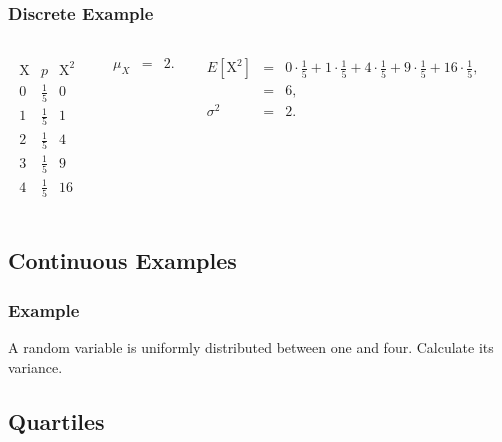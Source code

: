 \begin{frame}
  \frametitle{Discrete Example}


   \begin{columns}
     \begin{eqnarray*}
       \begin{array}{r|l|l}
         \mathrm{X} & p & \mathrm{X}^2\\ \hline
          0 & \frac{1}{5} & 0 \\ [5pt]
          1 & \frac{1}{5} & 1 \\ [5pt]
          2 & \frac{1}{5} & 4 \\ [5pt]
          3 & \frac{1}{5} & 9 \\ [5pt]
          4 & \frac{1}{5} & 16
       \end{array}
     \end{eqnarray*}

       \begin{eqnarray*}
         \mu_X & = & 2.
      \end{eqnarray*}

     {
       \begin{eqnarray*}
         E\left[\mathrm{X}^2\right] & = & 0 \cdot \frac{1}{5} + 1 \cdot \frac{1}{5} + 4 \cdot \frac{1}{5} + 9 \cdot \frac{1}{5} + 16 \cdot \frac{1}{5}, \\
         & = & 6, \\
         \sigma^2 & = & 2.
       \end{eqnarray*}
     }

   \end{columns}

  
\end{frame}



\subsection{Continuous Examples}

\begin{frame}
  \frametitle{Example}

  A random variable is uniformly distributed between one and
  four. Calculate its variance.
  
\end{frame}


\subsection{Quartiles}

